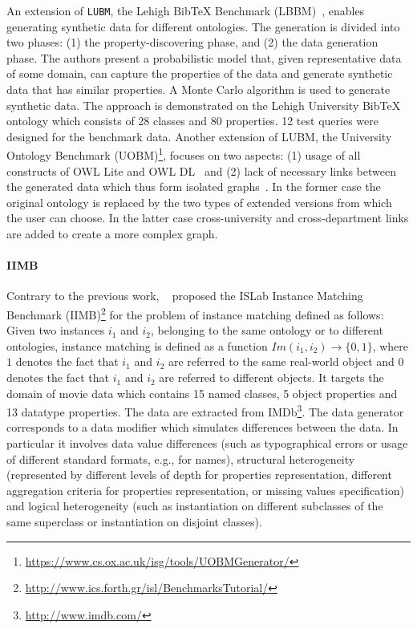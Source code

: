 An extension of \texttt{LUBM}, the Lehigh BibTeX Benchmark (LBBM)~\cite{Wang2005}, enables generating synthetic data for different ontologies. The generation is divided into two phases: (1) the property-discovering phase, and (2) the data generation phase. The authors present a probabilistic model that, given representative data of some domain, can capture the properties of the data and generate synthetic data that has similar properties. A Monte Carlo algorithm is used to generate synthetic data. The approach is demonstrated on the Lehigh University BibTeX ontology which consists of 28 classes and 80 properties. 12 test queries were designed for  the benchmark data. Another extension of LUBM, the University Ontology Benchmark (UOBM)\footnote{\url{https://www.cs.ox.ac.uk/isg/tools/UOBMGenerator/}}, focuses on two aspects: (1) usage of all constructs of OWL Lite and OWL DL~\cite{owl} and (2) lack of necessary links between the generated data which thus form isolated graphs~\cite{Ma:2006:TCO:2094613.2094629}. In the former case the original ontology is replaced by the two types of extended versions from which the user can choose. In the latter case cross-university and cross-department links are added to create a more complex graph.

\paragraph{IIMB} Contrary to the previous work, ~\cite{Ferrara08OM} proposed the ISLab Instance Matching Benchmark (IIMB)\footnote{\url{http://www.ics.forth.gr/isl/BenchmarksTutorial/}} for the problem of instance matching defined as follows: Given two instances $i_1$ and $i_2$, belonging to the same ontology or to different ontologies, instance matching is defined as a function $Im(i_1, i_2) \rightarrow \{0, 1\}$,  where $1$ denotes the fact that $i_1$ and $i_2$ are referred to the same real-world object and $0$ denotes the fact that $i_1$ and $i_2$ are referred to different objects. It targets the domain of movie data which contains 15 named classes, 5 object properties and 13 datatype properties. The data are extracted from IMDb\footnote{\url{http://www.imdb.com/}}. The data generator corresponds to a data modifier which simulates differences between the data. In particular it involves data value differences (such as typographical errors or usage of different standard formats, e.g., for names), structural heterogeneity (represented by different levels of depth for properties representation, different aggregation criteria for properties representation, or missing values specification) and logical heterogeneity (such as instantiation on different subclasses of the same superclass or instantiation on disjoint classes).


